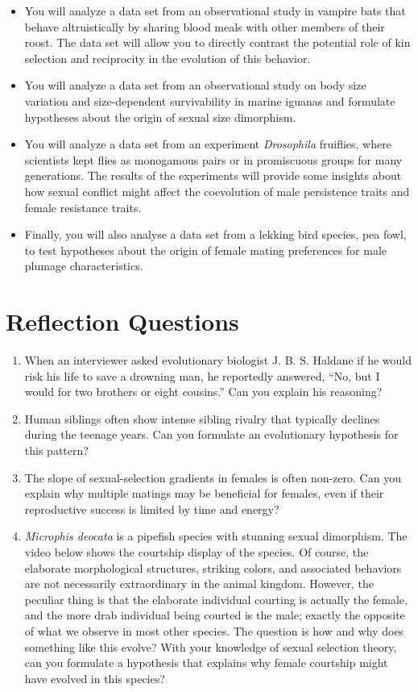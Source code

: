 \documentclass[
]{book}
\providecommand{\tightlist}{%
  \setlength{\itemsep}{0pt}\setlength{\parskip}{0pt}}
\begin{document}
\begin{itemize}
\item
  You will analyze a data set from an observational study in vampire bats that behave altruistically by sharing blood meals with other members of their roost. The data set will allow you to directly contrast the potential role of kin selection and reciprocity in the evolution of this behavior.
\item
  You will analyze a data set from an observational study on body size variation and size-dependent survivability in marine iguanas and formulate hypotheses about the origin of sexual size dimorphism.
\item
  You will analyze a data set from an experiment \emph{Drosophila} fruiflies, where scientists kept flies as monogamous pairs or in promiscuous groups for many generations. The results of the experiments will provide some insights about how sexual conflict might affect the coevolution of male persistence traits and female resistance traits.
\item
  Finally, you will also analyse a data set from a lekking bird species, pea fowl, to test hypotheses about the origin of female mating preferences for male plumage characteristics.
\end{itemize}

\hypertarget{reflection-questions-9}{%
\section{Reflection Questions}\label{reflection-questions-9}}

\begin{enumerate}
\def\labelenumi{\arabic{enumi}.}
\tightlist
\item
  When an interviewer asked evolutionary biologist J. B. S. Haldane if he would risk his life to save a drowning man, he reportedly answered, ``No, but I would for two brothers or eight cousins.'' Can you explain his reasoning?
\item
  Human siblings often show intense sibling rivalry that typically declines during the teenage years. Can you formulate an evolutionary hypothesis for this pattern?
\item
  The slope of sexual-selection gradients in females is often non-zero. Can you explain why multiple matings may be beneficial for females, even if their reproductive success is limited by time and energy?
\item
  \emph{Microphis deocata} is a pipefish species with stunning sexual dimorphism. The video below shows the courtship display of the species. Of course, the elaborate morphological structures, striking colors, and associated behaviors are not necessarily extraordinary in the animal kingdom. However, the peculiar thing is that the elaborate individual courting is actually the female, and the more drab individual being courted is the male; exactly the opposite of what we observe in most other species. The question is how and why does something like this evolve? With your knowledge of sexual selection theory, can you formulate a hypothesis that explains why female courtship might have evolved in this species?
\end{enumerate}
\end{document}
